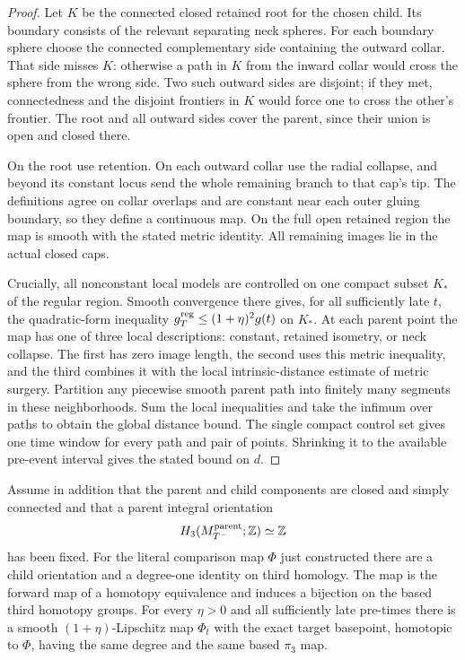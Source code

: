 \begin{proof}
Let $K$ be the connected closed retained root for the chosen child.
Its boundary consists of the relevant separating neck spheres.
For each boundary sphere choose the connected complementary side
containing the outward collar.  That side misses $K$: otherwise a
path in $K$ from the inward collar would cross the sphere from the
wrong side.  Two such outward sides are disjoint; if they met,
connectedness and the disjoint frontiers in $K$ would force one to
cross the other's frontier.  The root and all outward sides cover
the parent, since their union is open and closed there.

On the root use retention.  On each outward collar use the radial
collapse, and beyond its constant locus send the whole remaining
branch to that cap's tip.  The definitions agree on collar overlaps
and are constant near each outer gluing boundary, so they define a
continuous map.  On the full open retained region the map is smooth
with the stated metric identity.  All remaining images lie in the
actual closed caps.

Crucially, all nonconstant local models are controlled on one compact
subset $K_*$ of the regular region.  Smooth convergence there gives,
for all sufficiently late $t$, the quadratic-form inequality
$g_T^{\rm reg}\leq(1+\eta)^2g(t)$ on $K_*$.
At each parent point the map has one of three local descriptions:
constant, retained isometry, or neck collapse.  The first has zero
image length, the second uses this metric inequality, and the third
combines it with the local intrinsic-distance estimate of metric
surgery.  Partition any piecewise smooth parent path into finitely
many segments in these neighborhoods.  Sum the local inequalities
and take the infimum over paths to obtain the global distance bound.
The single compact control set gives one time window for every path
and pair of points.  Shrinking it to the available pre-event interval
gives the stated bound on $d$.
\end{proof}

\begin{theorem}
\label{thm:comparison-transport}
Assume in addition that the parent and child components are closed and simply
connected and that a parent integral orientation
\[
 H_3(M_{T^-}^{\rm parent};\mathbb Z)\simeq\mathbb Z
\]
has been fixed.  For the literal comparison map $\Phi$ just constructed there
are a child orientation and a degree-one identity on third homology.  The map
is the forward map of a homotopy equivalence and induces a bijection on the based
third homotopy groups.  For every $\eta>0$ and all sufficiently late
pre-times there is a smooth $(1+\eta)$-Lipschitz map $\Phi_t$ with the exact
target basepoint, homotopic to $\Phi$, having the same degree and the same
based $\pi_3$ map.
\cite[Proposition 15.12, p. 365; Claim 18.22, p. 433]{MT2007}
\end{theorem}

